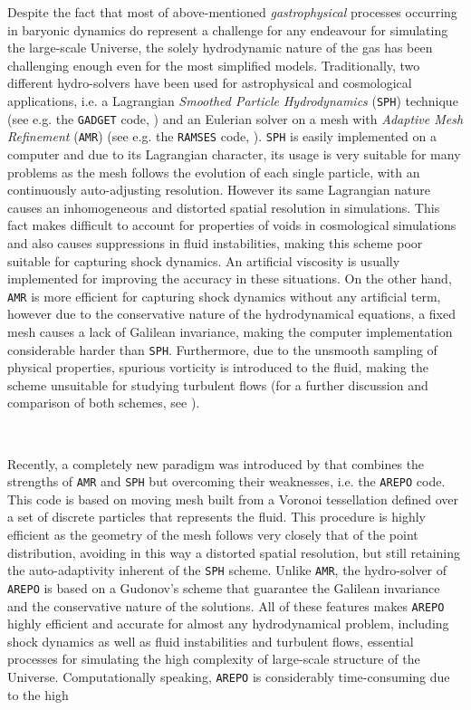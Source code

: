 \documentclass[a4,useAMS,usenatbib,usegraphicx,12pt]{article}
\begin{document}
Despite the fact that most of above-mentioned \textit{gastrophysical} processes
occurring in baryonic dynamics do represent a challenge for any endeavour for 
simulating the large-scale Universe, the solely hydrodynamic nature of the gas
has been challenging enough even for the most simplified models. Traditionally,
two different hydro-solvers have been used for astrophysical and cosmological 
applications, i.e. a Lagrangian \textit{Smoothed Particle Hydrodynamics} 
(\texttt{SPH}) technique \citep{Monaghan92} (see e.g. the \texttt{GADGET} code, 
\citet{Springel05}) and an Eulerian solver on a mesh with \textit{Adaptive Mesh 
Refinement} (\texttt{AMR}) \citep{Berger89} (see e.g. the \texttt{RAMSES} code, 
\citet{Teyssier02}). \texttt{SPH} is easily implemented on a computer and due to 
its Lagrangian character, its usage is very suitable for many problems as the 
mesh follows the evolution of each single particle, with an continuously 
auto-adjusting resolution. However its same Lagrangian nature causes an 
inhomogeneous and distorted spatial resolution in simulations. This fact makes 
difficult to account for properties of voids in cosmological simulations and also 
causes suppressions in fluid instabilities, making this scheme poor suitable for 
capturing shock dynamics. An artificial viscosity is usually implemented for 
improving the accuracy in these situations. On the other hand, \texttt{AMR} is 
more efficient for capturing shock dynamics without any artificial term, however 
due to the conservative nature of the hydrodynamical equations, a fixed mesh causes 
a lack of Galilean invariance, making the computer implementation considerable 
harder than \texttt{SPH}. Furthermore, due to the unsmooth sampling of physical 
properties, spurious vorticity is introduced to the fluid, making the scheme 
unsuitable for studying turbulent flows (for a further discussion and 
comparison of both schemes, see \citet{Plewa01}).

\

Recently, a completely new paradigm was introduced by \citet{Springel10} that
combines the strengths of \texttt{AMR} and \texttt{SPH} but overcoming their 
weaknesses, i.e. the \texttt{AREPO} code. This code is based on moving mesh 
built from a Voronoi tessellation defined over a set of discrete particles that 
represents the fluid. This procedure is highly efficient as the geometry of the 
mesh follows very closely that of the point distribution, avoiding in this way 
a distorted spatial resolution, but still retaining the auto-adaptivity inherent 
of the \texttt{SPH} scheme. Unlike \texttt{AMR}, the hydro-solver of 
\texttt{AREPO} is based on a Gudonov's scheme that guarantee the Galilean 
invariance and the conservative nature of the solutions. All of these features
makes \texttt{AREPO} highly efficient and accurate for almost any hydrodynamical
problem, including shock dynamics as well as fluid instabilities and turbulent 
flows, essential processes for simulating the high complexity of large-scale 
structure of the Universe. Computationally speaking, \texttt{AREPO} is 
considerably time-consuming due to the high 
\end{document}
